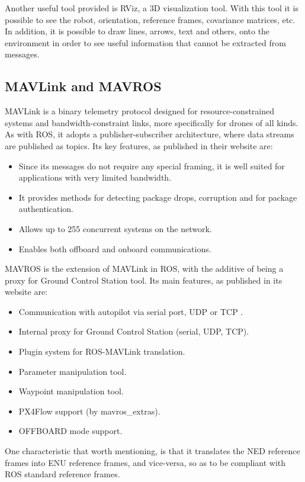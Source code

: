 Another useful tool provided is \ac{RViz}, a 3D visualization tool. With this tool it is possible to see the robot, orientation, reference frames, covariance matrices, etc. In addition, it is possible to draw lines, arrows, text and others, onto the environment in order to see useful information that cannot be extracted from messages.

\subsection{MAVLink and MAVROS}
\label{sssec:chapter2:drone:mavlink}
\nocite{mavlink}
MAVLink is a binary telemetry protocol designed for resource-constrained systems and bandwidth-constraint links, more specifically for drones of all kinds. As with ROS, it adopts a publisher-subscriber architecture, where data streams are published as topics. Its key features, as published in their website are:
\begin{itemize}
    \item Since its messages do not require any special framing, it is well suited for applications with very limited bandwidth.
    \item It provides methods for detecting package drops, corruption and for package authentication.
    \item Allows up to 255 concurrent systems on the network.
    \item Enables both offboard and onboard communications.
\end{itemize}
\nocite{mavros}
MAVROS is the extension of MAVLink in ROS, with the additive of being a proxy for Ground Control Station tool. Its main features, as published in its website are:
\begin{itemize}
    \item Communication with autopilot via serial port, UDP or TCP .
    \item Internal proxy for Ground Control Station (serial, UDP, TCP).
    \item Plugin system for ROS-MAVLink translation.
    \item Parameter manipulation tool.
    \item Waypoint manipulation tool.
    \item PX4Flow support (by mavros\_extras).
    \item OFFBOARD mode support.
\end{itemize}

One characteristic that worth mentioning, is that it translates the \ac{NED} reference frames into \ac{ENU} reference frames, and vice-versa, so as to be compliant with ROS standard reference frames.

